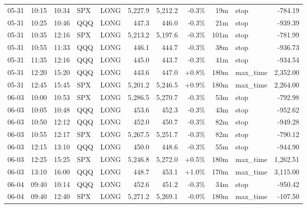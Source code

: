 \documentclass[11pt,a4paper,twoside]{article}
\begin{document}
\begin{center}
\begin{longtable}{>{\color{txtmain}}l l l l l r r r r >{\color{txtmain}}l r}
05-31 & 10:15 & 10:34 & SPX & LONG & 5,227.9 & 5,212.2 & \textcolor{lossred}{-0.3\%} & 19m & stop & \textcolor{lossred}{-784.19} \\
05-31 & 10:25 & 10:46 & QQQ & LONG & 447.3 & 446.0 & \textcolor{lossred}{-0.3\%} & 21m & stop & \textcolor{lossred}{-939.39} \\
05-31 & 10:35 & 12:16 & SPX & LONG & 5,213.2 & 5,197.6 & \textcolor{lossred}{-0.3\%} & 101m & stop & \textcolor{lossred}{-781.99} \\
05-31 & 10:55 & 11:33 & QQQ & LONG & 446.1 & 444.7 & \textcolor{lossred}{-0.3\%} & 38m & stop & \textcolor{lossred}{-936.73} \\
05-31 & 11:35 & 12:16 & QQQ & LONG & 445.0 & 443.7 & \textcolor{lossred}{-0.3\%} & 41m & stop & \textcolor{lossred}{-934.54} \\
05-31 & 12:20 & 15:20 & QQQ & LONG & 443.6 & 447.0 & \textcolor{wingreen}{+0.8\%} & 180m & max\_time & \textcolor{wingreen}{2,352.00} \\
05-31 & 12:45 & 15:45 & SPX & LONG & 5,201.2 & 5,246.5 & \textcolor{wingreen}{+0.9\%} & 180m & max\_time & \textcolor{wingreen}{2,264.00} \\
06-03 & 10:00 & 10:53 & SPX & LONG & 5,286.5 & 5,270.7 & \textcolor{lossred}{-0.3\%} & 53m & stop & \textcolor{lossred}{-792.98} \\
06-03 & 10:05 & 10:48 & QQQ & LONG & 453.6 & 452.3 & \textcolor{lossred}{-0.3\%} & 43m & stop & \textcolor{lossred}{-952.62} \\
06-03 & 10:50 & 12:12 & QQQ & LONG & 452.0 & 450.7 & \textcolor{lossred}{-0.3\%} & 82m & stop & \textcolor{lossred}{-949.28} \\
06-03 & 10:55 & 12:17 & SPX & LONG & 5,267.5 & 5,251.7 & \textcolor{lossred}{-0.3\%} & 82m & stop & \textcolor{lossred}{-790.12} \\
06-03 & 12:15 & 13:10 & QQQ & LONG & 450.0 & 448.6 & \textcolor{lossred}{-0.3\%} & 55m & stop & \textcolor{lossred}{-944.90} \\
06-03 & 12:25 & 15:25 & SPX & LONG & 5,246.8 & 5,272.0 & \textcolor{wingreen}{+0.5\%} & 180m & max\_time & \textcolor{wingreen}{1,262.51} \\
06-03 & 13:10 & 16:00 & QQQ & LONG & 448.7 & 453.1 & \textcolor{wingreen}{+1.0\%} & 170m & max\_time & \textcolor{wingreen}{3,115.00} \\
06-04 & 09:40 & 10:14 & QQQ & LONG & 452.6 & 451.2 & \textcolor{lossred}{-0.3\%} & 34m & stop & \textcolor{lossred}{-950.42} \\
06-04 & 09:40 & 12:40 & SPX & LONG & 5,271.2 & 5,269.1 & \textcolor{lossred}{-0.0\%} & 180m & max\_time & \textcolor{lossred}{-107.50} \\

\end{longtable}
\end{center}
\end{document}
